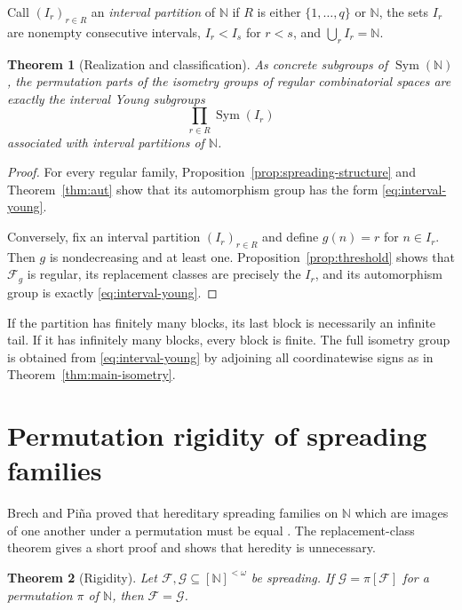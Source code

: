 \documentclass[11pt]{article}
\newtheorem{theorem}{Theorem}[section]
\theoremstyle{definition}
\theoremstyle{remark}
\newcommand{\N}{\mathbb N}
\newcommand{\F}{\mathcal F}
\newcommand{\G}{\mathcal G}
\newcommand{\Sym}{\operatorname{Sym}}
\begin{document}
Call $(I_r)_{r\in R}$ an \emph{interval partition} of $\N$ if $R$ is either
$\{1,\ldots,q\}$ or $\N$, the sets $I_r$ are nonempty consecutive intervals,
$I_r<I_s$ for $r<s$, and $\bigcup_r I_r=\N$.

\begin{theorem}[Realization and classification]\label{thm:realization}
As concrete subgroups of $\Sym(\N)$, the permutation parts of the isometry
groups of regular combinatorial spaces are exactly the interval Young
subgroups
\[
  \prod_{r\in R}\Sym(I_r)
  \tag{6.1}\label{eq:interval-young}
\]
associated with interval partitions of $\N$.
\end{theorem}

\begin{proof}
For every regular family, Proposition~\ref{prop:spreading-structure} and
Theorem~\ref{thm:aut} show that its automorphism group has the form
\eqref{eq:interval-young}.

Conversely, fix an interval partition $(I_r)_{r\in R}$ and define
$g(n)=r$ for $n\in I_r$.  Then $g$ is nondecreasing and at least one.
Proposition~\ref{prop:threshold} shows that $\F_g$ is regular, its replacement
classes are precisely the $I_r$, and its automorphism group is exactly
\eqref{eq:interval-young}.
\end{proof}

If the partition has finitely many blocks, its last block is necessarily an
infinite tail.  If it has infinitely many blocks, every block is finite.  The
full isometry group is obtained from \eqref{eq:interval-young} by adjoining
all coordinatewise signs as in Theorem~\ref{thm:main-isometry}.

\section{Permutation rigidity of spreading families}

Brech and Pi\~na proved that hereditary spreading families on $\N$ which are
images of one another under a permutation must be equal
\cite[Theorem~14]{BP}.  The replacement-class theorem gives a short proof and
shows that heredity is unnecessary.

\begin{theorem}[Rigidity]\label{thm:rigidity}
Let $\F,\G\subseteq[\N]^{<\omega}$ be spreading.  If
$\G=\pi[\F]$ for a permutation $\pi$ of $\N$, then $\F=\G$.
\end{theorem}
\end{document}
